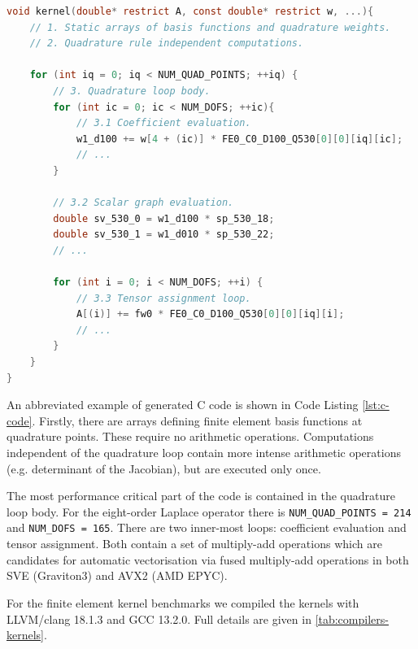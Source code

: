 \lstset{style=CStyle}
\begin{lstlisting}[language=c,
    caption=Abbreviated FFCx generated finite element kernel.,
    basicstyle=\ttfamily\scriptsize,
    keywordstyle=\ttb\color{deepblue}\scriptsize,
    label=lst:c-code]
void kernel(double* restrict A, const double* restrict w, ...){
    // 1. Static arrays of basis functions and quadrature weights.
    // 2. Quadrature rule independent computations.

    for (int iq = 0; iq < NUM_QUAD_POINTS; ++iq) {
        // 3. Quadrature loop body.
        for (int ic = 0; ic < NUM_DOFS; ++ic){
            // 3.1 Coefficient evaluation.
            w1_d100 += w[4 + (ic)] * FE0_C0_D100_Q530[0][0][iq][ic];
            // ...
        }

        // 3.2 Scalar graph evaluation.
        double sv_530_0 = w1_d100 * sp_530_18;
        double sv_530_1 = w1_d010 * sp_530_22;
        // ...

        for (int i = 0; i < NUM_DOFS; ++i) {
            // 3.3 Tensor assignment loop.
            A[(i)] += fw0 * FE0_C0_D100_Q530[0][0][iq][i];
            // ...
        }
    }
}
\end{lstlisting}

An abbreviated example of generated C code is shown in Code Listing
\ref{lst:c-code}. Firstly, there are arrays defining finite element basis
functions at quadrature points. These require no arithmetic operations. Computations
independent of the quadrature loop contain more intense arithmetic operations
(e.g. determinant of the Jacobian), but are executed only once.

The most performance critical part of the code is contained in the quadrature
loop body. For the eight-order Laplace operator there is
\lstinline{NUM_QUAD_POINTS = 214} and \lstinline{NUM_DOFS = 165}. There are two
inner-most loops: coefficient evaluation and tensor assignment. Both contain a
set of multiply-add operations which are candidates for automatic vectorisation
via fused multiply-add operations in both SVE (Graviton3) and AVX2 (AMD EPYC).

For the finite element kernel benchmarks we compiled the kernels with
LLVM/clang 18.1.3 and GCC 13.2.0. Full details are given in
\autoref{tab:compilers-kernels}.

